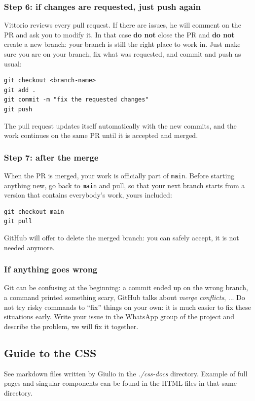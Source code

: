 \subsubsection{Step 6: if changes are requested, just push again}
\label{sec:git-step6}

Vittorio reviews every pull request. If there are issues, he will comment on
the PR and ask you to modify it. In that case \textbf{do not} close the PR
and \textbf{do not} create a new branch: your branch is still the right place
to work in. Just make sure you are on your branch, fix what was requested,
and commit and push as usual:
\begin{verbatim}
git checkout <branch-name>
git add .
git commit -m "fix the requested changes"
git push
\end{verbatim}
The pull request updates itself automatically with the new commits, and the
work continues on the same PR until it is accepted and merged.

\subsubsection{Step 7: after the merge}
\label{sec:git-step7}

When the PR is merged, your work is officially part of \texttt{main}. Before
starting anything new, go back to \texttt{main} and pull, so that your next
branch starts from a version that contains everybody's work, yours included:
\begin{verbatim}
git checkout main
git pull
\end{verbatim}
GitHub will offer to delete the merged branch: you can safely accept, it is
not needed anymore.

\subsubsection{If anything goes wrong}
\label{sec:git-troubles}

Git can be confusing at the beginning: a commit ended up on the wrong branch,
a command printed something scary, GitHub talks about
\emph{merge conflicts}, ... Do not try risky commands to ``fix'' things on your own:
it is much easier to fix these situations early.
Write your issue in the WhatsApp group of the project and
describe the problem, we will fix it together.

\subsection{Guide to the CSS}
\label{sec:css-guide}
See markdown files written by Giulio in the \emph{./css-docs} directory.
Example of full pages and singular components can be found in the HTML files in that same directory.
